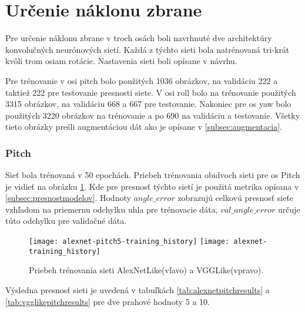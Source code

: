 
\section{Určenie náklonu zbrane}
Pre určenie náklonu zbrane v troch osách boli navrhnuté dve architektúry konvolučných neurónových sietí.
Každá z týchto sieti bola natrénovaná tri-krát kvôli trom osiam rotácie.
Nastavenia sieti boli opísane v návrhu.

Pre trénovanie v osi pitch bolo použitých 1036 obrázkov, na validáciu 222 a taktiež 222 pre testovanie presnosti siete.
V osi roll bolo na trénovanie použitých 3315 obrázkov, na validáciu 668 a 667 pre testovanie.
Nakoniec pre os yaw bolo použitých 3220 obrázkov na trénovanie a po 690 na validáciu a testovanie.
Všetky tieto obrázky prešli augmentáciou dát ako je opísane v \ref{subsec:augmentacia}.

\subsubsection{Pitch}
Sieť bola trénovaná v 50 epochách.
Priebeh trénovania obidvoch sieti pre os Pitch je vidieť na obrázku \ref{pic:pitchaxis}.
Kde pre presnosť týchto sietí je použitá metrika opísana v \ref{subsec:presnostmodelov}.
Hodnoty $angle\_error$ zobrazujú celkovú presnosť sieťe vzhľadom na priemernu odchylku uhla pre trénovacie dáta,
    $val\_angle\_error$ určuje túto odchylku pre validačné dáta.

\begin{figure}[H]
    \centering
    \texttt{[image: alexnet-pitch5-training\_history]}
	\texttt{[image: alexnet-training\_history]} %
	\caption{Priebeh trénovania sieti AlexNetLike(vľavo) a VGGLike(vpravo).}
	\label{pic:pitchaxis}
\end{figure}

Výsledna presnosť sieti je uvedená v tabuľkách \ref{tab:alexnetpitchresults} a \ref{tab:vgglikepitchresults} pre dve prahové hodnoty 5 a 10.

